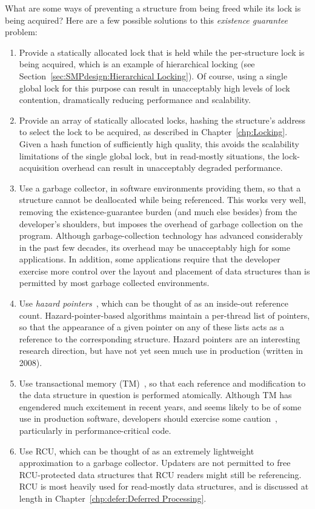 \QuickQ{}
	What are some ways of preventing a structure from being freed while
	its lock is being acquired?
\QuickA{}
	Here are a few possible solutions to this \emph{existence guarantee}
	problem:

	\begin{enumerate}
	\item	Provide a statically allocated lock that is held while
		the per-structure lock is being acquired, which is an
		example of hierarchical locking (see
		Section~\ref{sec:SMPdesign:Hierarchical Locking}).
		Of course, using a single global lock for this purpose
		can result in unacceptably high levels of lock contention,
		dramatically reducing performance and scalability.
	\item	Provide an array of statically allocated locks, hashing
		the structure's address to select the lock to be acquired,
		as described in Chapter~\ref{chp:Locking}.
		Given a hash function of sufficiently high quality, this
		avoids the scalability limitations of the single global
		lock, but in read-mostly situations, the lock-acquisition
		overhead can result in unacceptably degraded performance.
	\item	Use a garbage collector, in software environments providing
		them, so that a structure cannot be deallocated while being
		referenced.
		This works very well, removing the existence-guarantee
		burden (and much else besides) from the developer's
		shoulders, but imposes the overhead of garbage collection
		on the program.
		Although garbage-collection technology has advanced
		considerably in the past few decades, its overhead
		may be unacceptably high for some applications.
		In addition, some applications require that the developer
		exercise more control over the layout and placement of
		data structures than is permitted by most garbage collected
		environments.
	\item	Use \emph{hazard pointers}~\cite{MagedMichael04a}, which
		can be thought of as an inside-out reference count.
		Hazard-pointer-based algorithms maintain a per-thread list of
		pointers, so that the appearance of a given pointer on
		any of these lists acts as a reference to the corresponding
		structure.
		Hazard pointers are an interesting research direction, but
		have not yet seen much use in production (written in 2008).
	\item	Use transactional memory
		(TM)~\cite{Herlihy93a,DBLomet1977SIGSOFT,Shavit95},
		so that each reference and
		modification to the data structure in question is
		performed atomically.
		Although TM has engendered much excitement in recent years,
		and seems likely to be of some use in production software,
		developers should exercise some
		caution~\cite{McKenney2007PLOSTM}, particularly in
		performance-critical code.
	\item	Use RCU, which can be thought of as an extremely lightweight
		approximation to a garbage collector.
		Updaters are not permitted to free RCU-protected
		data structures that RCU readers might still be referencing.
		RCU is most heavily used for read-mostly data structures,
		and is discussed at length in
		Chapter~\ref{chp:defer:Deferred Processing}.
	\end{enumerate}

